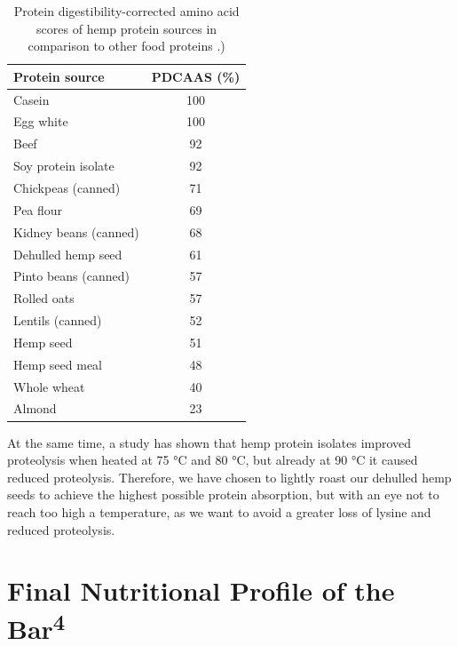 \begin{table}[h]
    \centering
    \caption{Protein digestibility-corrected amino acid scores of hemp protein sources in comparison to other food proteins \cite*{house2010evaluating}.)}
    \label{tab:process_table_01}
    \begin{tabular}{l c}
    \hline
    \textbf{Protein source} & \textbf{PDCAAS (\%)} \\
    \hline
    Casein               & 100 \\
    Egg white            & 100 \\
    Beef                 & 92  \\
    Soy protein isolate  & 92  \\
    Chickpeas (canned)   & 71  \\
    Pea flour            & 69  \\
    Kidney beans (canned)& 68  \\
    Dehulled hemp seed   & 61  \\
    Pinto beans (canned) & 57  \\
    Rolled oats          & 57  \\
    Lentils (canned)     & 52  \\
    Hemp seed            & 51  \\
    Hemp seed meal       & 48  \\
    Whole wheat          & 40  \\
    Almond               & 23  \\
    \hline
    \end{tabular}
\end{table}

\vspace{1em}
At the same time, a study has shown that hemp protein isolates improved proteolysis when heated at 75 °C and 80 °C, but already at 90 °C it caused reduced proteolysis. \cite*{aluko2017hemp} Therefore, we have chosen to lightly roast our dehulled hemp seeds to achieve the highest possible protein absorption, but with an eye not to reach too high a temperature, as we want to avoid a greater loss of lysine and reduced proteolysis.


\section{Final Nutritional Profile of the Bar\textsuperscript{4}}
